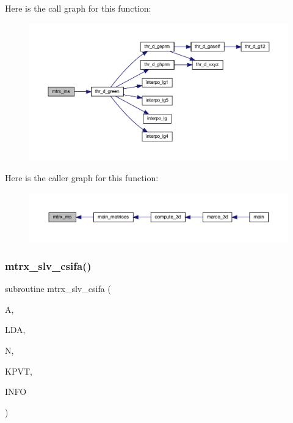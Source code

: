 Here is the call graph for this function\+:
\nopagebreak
\begin{figure}[H]
\begin{center}
\leavevmode
\includegraphics[width=350pt]{Marco_8f90_acd41ae7686429d1720e6242646b50bc1_cgraph}
\end{center}
\end{figure}
Here is the caller graph for this function\+:
\nopagebreak
\begin{figure}[H]
\begin{center}
\leavevmode
\includegraphics[width=350pt]{Marco_8f90_acd41ae7686429d1720e6242646b50bc1_icgraph}
\end{center}
\end{figure}
\mbox{\label{Marco_8f90_ac6e18477fef3905abe6474ab133dcfaa}} 
\subsubsection{\texorpdfstring{mtrx\+\_\+slv\+\_\+csifa()}{mtrx\_slv\_csifa()}}
{\footnotesize\ttfamily subroutine mtrx\+\_\+slv\+\_\+csifa (\begin{DoxyParamCaption}\item[{complex, dimension(lda,n)}]{A,  }\item[{integer}]{L\+DA,  }\item[{integer}]{N,  }\item[{integer, dimension(n)}]{K\+P\+VT,  }\item[{integer}]{I\+N\+FO }\end{DoxyParamCaption})}

